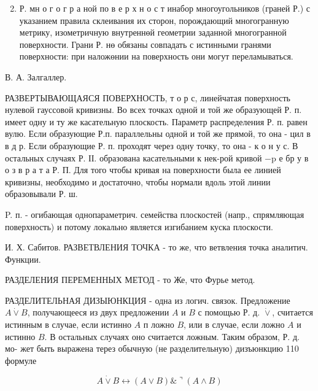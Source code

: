 \documentclass[10pt]{article}
\begin{document}
\begin{enumerate}

  \setcounter{enumi}{1}

  \item Р. мн о г о г р а ной по в е р х н о с т инабор многоугольников (граней Р.) с указанием правила склеивания их сторон, порождающий многогранную метрику, изометричную внутреннөй геометрии заданной многогранной поверхности. Грани Р. нө обязаны совпадать с истинными гранями поверхности: при наложөнии на поверхность они могут переламываться.

\end{enumerate}



В. А. Залгаллер.



РАЗВЕРТЫВАЮЩАЯСЯ ПОВЕРХНОСТЬ, т о р с, линейчатая поверхность нулевой гауссовой кривизны. Во всех точках одной и той же образующей Р. п. имеет одну и ту же касательную плоскость. Параметр распределения Р. п. равен вулю. Если образующие Р.п. параллельны одной и той же прямой, то она - цил в в д р. Если образующие Р. п. проходят через одну точку, то она - к о н у с. В остальных случаях Р. ІІ. образована касательными к нек-рой кривой $-\mathrm{p}$ е бр у в о з в р а т а Р. П. Для того чтобы кривая на поверхности была ее линией кривизны, необходимо и достаточно, чтобы нормали вдоль этой линии образовывали Р. ш.



P. п. - огибающая однопараметрич. семейства плоскостей (напр., спрямляющая поверхность) и потому локально является изгибанием куска плоскости.



И. Х. Сабитов. РАЗВЕТВЛЕНИЯ ТОЧКА - то же, что ветвления точка аналитич. Функции.



РАЗДЕЛЕНИЯ ПЕРЕМЕННЫХ МЕТОД - то Же, что Фурье метод.



РАЗДЕЛИТЕЛЬНАЯ ДИЗЫЮНКЦИЯ - одна из логич. связок. Предложение $A \dot{\vee} B$, получающееся из двух предложении $A$ и $B$ с помощью Р. д. $\dot{\vee}$, считается истинным в случае, если истинно $A$ п ложно $B$, или в случае, если ложно $A$ и истинно $B$. В остальных случаях оно считается ложным. Таким образом, Р. д. мо- жет быть выражена терез обычную (не разделительную) дизъюнкцию 110 формуле



\[

A \dot{\vee} B \leftrightarrow(A \vee B) \&\urcorner(A \wedge B)

\]
\end{document}

